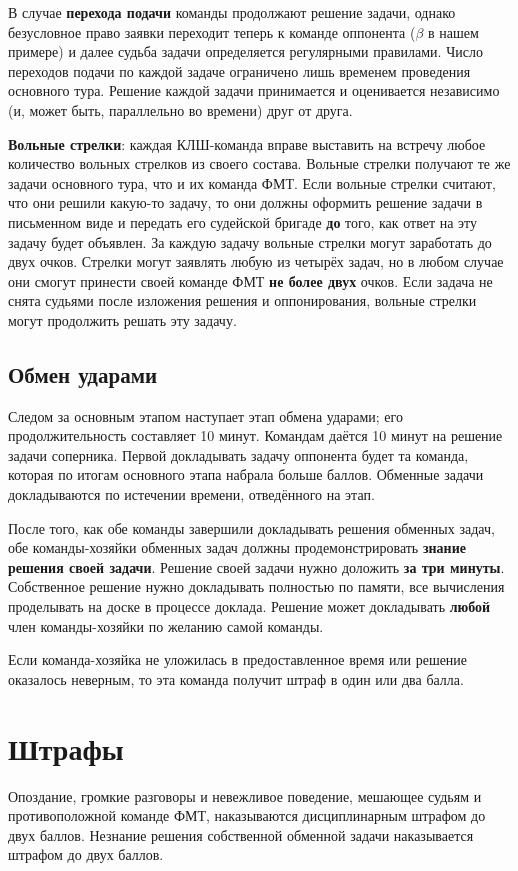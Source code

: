 \documentclass[12pt,a4paper]{article}
\begin{document}
В случае \textbf{перехода подачи} команды продолжают решение задачи, однако безусловное право заявки переходит теперь к команде оппонента ($\beta$ в нашем примере) и далее судьба задачи определяется регулярными правилами. 
Число переходов подачи по каждой задаче ограничено лишь временем проведения основного тура. 
Решение каждой задачи принимается и оценивается независимо (и, может быть, параллельно во времени) друг от друга.

{\bf Вольные стрелки}: каждая КЛШ-команда вправе выставить на встречу любое количество вольных стрелков из своего состава. 
Вольные стрелки получают те же задачи основного тура, что и их команда ФМТ. 
Если вольные стрелки считают, что они решили какую-то задачу, то они должны оформить решение задачи в письменном виде и передать его судейской бригаде \textbf{до} того, как ответ на эту задачу будет объявлен. За каждую задачу вольные стрелки могут заработать до двух очков. Стрелки могут заявлять любую из четырёх задач, но в любом случае они смогут принести своей команде ФМТ \textbf{не более двух} очков. Если задача не снята судьями после изложения решения и оппонирования, вольные стрелки могут продолжить решать эту задачу.

\subsection{Обмен ударами}
Следом за основным этапом наступает этап обмена ударами; его продолжительность составляет 10 минут. Командам даётся 10 минут на решение задачи соперника. Первой докладывать задачу оппонента будет та команда, которая по итогам основного этапа набрала больше баллов. Обменные задачи докладываются по истечении времени, отведённого на этап.

После того, как обе команды завершили докладывать решения обменных задач, обе команды-хозяйки обменных задач должны продемонстрировать \textbf{знание решения своей задачи}. Решение своей задачи нужно доложить \textbf{за три минуты}. Собственное решение нужно докладывать полностью по памяти, все вычисления проделывать на доске в процессе доклада. Решение может докладывать {\bf любой} член команды-хозяйки по желанию самой команды.

Если команда-хозяйка не уложилась в предоставленное время или решение оказалось неверным, то эта команда получит штраф в один или два балла.

\section{Штрафы}
Опоздание, громкие разговоры и невежливое поведение, мешающее судьям и противоположной команде ФМТ, наказываются дисциплинарным штрафом до двух баллов. 
Незнание решения собственной обменной задачи наказывается штрафом до двух баллов.
\end{document}
